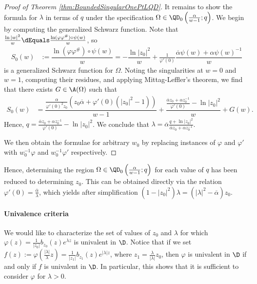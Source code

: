 \documentclass{article}
\numberwithin{equation}{section}
\begin{document}
\begin{proof}[Proof of Theorem \ref{thm:BoundedSingularOnePtLQD}]
It remains to show the formula for $\lambda$ in terms of $q$ under the specification $\Omega\in\QD_0\left(\frac{\alpha}{w-1};q\right)$. We begin by computing the generalized Schwarz function. Note that $\frac{\ln|w|^2}{w}\dEquals \frac{\ln(\varphi\varphi^{\#})\circ\psi(w)}{w}$, so
\begin{align*}
    S_0(w)&:=\dfrac{\ln(\varphi\varphi^{\#})\circ\psi(w)}{w}=-\dfrac{\ln|z_0|^2}{w}+\frac{1}{\varphi'(0)}\dfrac{\overline{\alpha}\psi(w)+\alpha\psi(w)^{-1}}{w}
\end{align*}
is a generalized Schwarz function for $\Omega$. Noting the singularities at $w=0$ and $w=1$, computing their residues, and applying Mittag-Leffler's theorem, we find that there exists $G\in\A(\Omega)$ such that
\begin{align*}
    S_0(w)&=\dfrac{\frac{\alpha}{\varphi'(0)^2z_0}(z_0\overline{\alpha}+\varphi'(0)(|z_0|^2-1))}{w-1}+\dfrac{\frac{\overline{\alpha}z_0+\alpha z_0^{-1}}{\varphi'(0)}-\ln|z_0|^2}{w}+G(w).
\end{align*}
Hence, $q=\frac{\overline{\alpha}z_0+\alpha z_0^{-1}}{\varphi'(0)}-\ln|z_0|^2$. We conclude that $\lambda=\overline{\alpha}\frac{q+\ln|z_0|^2}{\overline{\alpha}z_0+\alpha z_0^{-1}}$.

We then obtain the formulae for arbitrary $w_0$ by replacing instances of $\varphi$ and $\varphi'$ with $w_0^{-1}\varphi$ and $w_0^{-1}\varphi'$ respectively.
\end{proof}
Hence, determining the region $\Omega\in\QD_0\left(\frac{\alpha}{w-1};q\right)$ for each value of $q$ has been reduced to determining $z_0$. This can be obtained directly via the relation $\varphi'(0)=\frac{\overline{\alpha}}{\lambda}$, which yields after simplification $(1-|z_0|^2)\lambda=(|\lambda|^2-\overline{\alpha})z_0$.


\paragraph{Univalence criteria}
We would like to characterize the set of values of $z_0$ and $\lambda$ for which $\varphi(z)=\frac{1}{|z_0|}b_{z_0}(z)e^{\lambda z}$ is univalent in $\D$. Notice that if we set $f(z):=\varphi\left(\frac{|\lambda|}{\lambda}z\right)=\frac{1}{|z_1|}b_{z_1}(z)e^{|\lambda|z}$, where $z_1=\frac{\lambda}{|\lambda|}z_0$, then $\varphi$ is univalent in $\D$ if and only if $f$ is univalent in $\D$. In particular, this shows that it is sufficient to consider $\varphi$ for $\lambda>0$.
\end{document}
